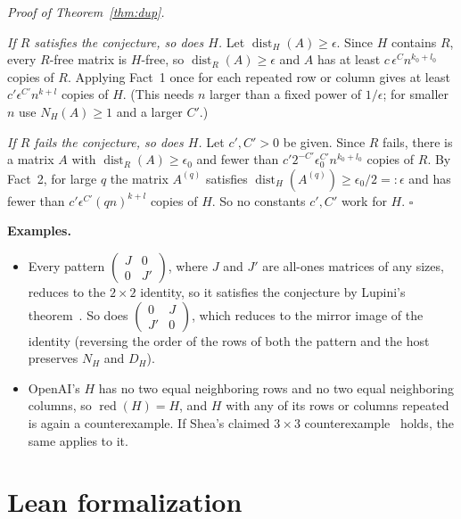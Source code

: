 \documentclass{article}
\DeclareMathOperator{\dist}{dist}
\theoremstyle{plain}
\theoremstyle{definition}
\begin{document}
\medskip
\emph{Proof of Theorem~\ref{thm:dup}.}

\emph{If $R$ satisfies the conjecture, so does $H$.} Let $\dist_H(A)\ge\epsilon$. Since $H$
contains $R$, every $R$-free matrix is $H$-free, so $\dist_R(A)\ge\epsilon$ and $A$ has at least
$c\,\epsilon^Cn^{k_0+l_0}$ copies of $R$. Applying Fact~1 once for each repeated row or column gives at least
$c'\epsilon^{C'}n^{k+l}$ copies of $H$. (This needs $n$ larger than a fixed power of $1/\epsilon$; for smaller
$n$ use $N_H(A)\ge1$ and a larger $C'$.)

\emph{If $R$ fails the conjecture, so does $H$.} Let $c',C'>0$ be given. Since $R$ fails, there is a matrix
$A$ with $\dist_R(A)\ge\epsilon_0$ and fewer than $c'2^{-C'}\epsilon_0^{C'}n^{k_0+l_0}$ copies of
$R$. By Fact~2, for large $q$ the matrix $A^{(q)}$ satisfies
$\dist_H(A^{(q)})\ge\epsilon_0/2=:\epsilon$ and has fewer than $c'\epsilon^{C'}(qn)^{k+l}$ copies
of $H$. So no constants $c',C'$ work for $H$. $\square$

\medskip
\textbf{Examples.}
\begin{itemize}
\item Every pattern $\begin{pmatrix} J & 0 \\ 0 & J' \end{pmatrix}$, where $J$ and $J'$ are all-ones matrices of
 any sizes, reduces to the $2\times2$ identity, so it satisfies the conjecture by Lupini's theorem~\cite{Lupini}.
 So does $\begin{pmatrix} 0 & J \\ J' & 0 \end{pmatrix}$, which reduces to the mirror image of the identity
 (reversing the order of the rows of both the pattern and the host preserves $N_H$ and $D_H$).
\item OpenAI's $H$ has no two equal neighboring rows and no two equal neighboring columns, so
 $\operatorname{red}(H)=H$, and $H$ with any of its rows or columns repeated is again a counterexample.
 If Shea's claimed $3\times3$ counterexample~\cite{shea} holds, the same applies to it.
\end{itemize}

\section*{Lean formalization}
\end{document}
